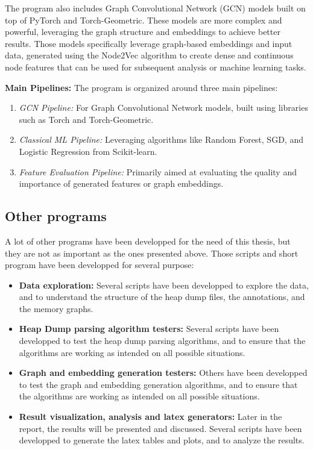 The program also includes Graph Convolutional Network (GCN) models built on top of PyTorch and Torch-Geometric. These models are more complex and powerful, leveraging the graph structure and embeddings to achieve better results. Those models specifically leverage graph-based embeddings and input data, generated using the Node2Vec algorithm to create dense and continuous node features that can be used for subsequent analysis or machine learning tasks.

\textbf{Main Pipelines:}
The program is organized around three main pipelines:
\begin{enumerate}
    \item \textit{GCN Pipeline:} For Graph Convolutional Network models, built using libraries such as Torch and Torch-Geometric.
    \item \textit{Classical ML Pipeline:} Leveraging algorithms like Random Forest, SGD, and Logistic Regression from Scikit-learn.
    \item \textit{Feature Evaluation Pipeline:} Primarily aimed at evaluating the quality and importance of generated features or graph embeddings.
\end{enumerate}

\subsection{Other programs}
A lot of other programs have been developped for the need of this thesis, but they are not as important as the ones presented above. Those scripts and short program have been developped for several purpose:

\begin{itemize}
    \item \textbf{Data exploration:} Several scripts have been developped to explore the data, and to understand the structure of the heap dump files, the annotations, and the memory graphs.
    \item \textbf{Heap Dump parsing algorithm testers:} Several scripts have been developped to test the heap dump parsing algorithms, and to ensure that the algorithms are working as intended on all possible situations.
    \item \textbf{Graph and embedding generation testers:} Others have been developped to test the graph and embedding generation algorithms, and to ensure that the algorithms are working as intended on all possible situations.
    \item \textbf{Result visualization, analysis and latex generators:} Later in the report, the results will be presented and discussed. Several scripts have been developped to generate the latex tables and plots, and to analyze the results.
\end{itemize}

